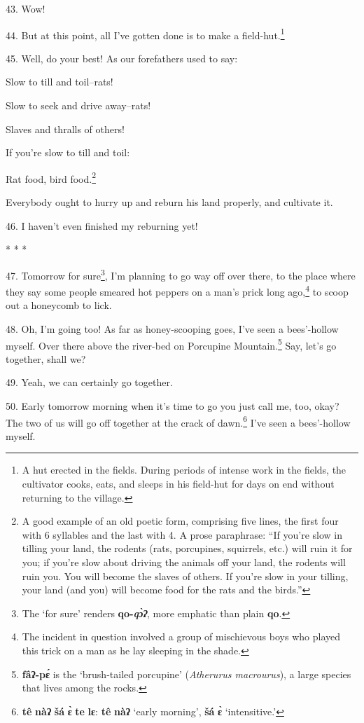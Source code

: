 43. Wow!

44. But at this point, all I've gotten done is to make a field-hut.\footnote{A hut erected in the fields. During periods of intense work in the fields, the cultivator cooks, eats, and sleeps in his field-hut for days on end without returning to the village.}

45. Well, do your best! As our forefathers used to say:

Slow to till and toil--rats!

Slow to seek and drive away--rats!

Slaves and thralls of others!

If you're slow to till and toil:

Rat food, bird food.\footnote{A good example of an old poetic form, comprising five lines, the first four with 6 syllables and the last with 4. A prose paraphrase: ``If you're slow in tilling your land, the rodents (rats, porcupines, squirrels, etc.) will ruin it for you; if you're slow about driving the animals off your land, the rodents will ruin you. You will become the slaves of others. If you're slow in your tilling, your land (and you) will become food for the rats and the birds.''}

Everybody ought to hurry up and reburn his land properly, and cultivate it.

46. I haven't even finished my reburning yet!

* * *

47. Tomorrow for sure\footnote{The `for sure' renders \textbf{qo-\textit{\emph{qɔ̀ʔ}}}, more emphatic than plain \textbf{qo}.}, I'm planning to go way off over there, to the place
where they say some people smeared hot peppers on a man's prick long ago,\footnote{The incident in question involved a group of mischievous boys who played this trick on a man as he lay sleeping in the shade.} to
scoop out a honeycomb to lick.

48. Oh, I'm going too! As far as honey-scooping goes, I've seen a bees'-hollow
myself. Over there above the river-bed on Porcupine Mountain.\footnote{\textbf{fâʔ-pɛ́} is the `brush-tailed porcupine' (\textit{Atherurus macrourus}), a large species that lives among the rocks.} Say, let's go
together, shall we?

49. Yeah, we can certainly go together.

50. Early tomorrow morning when it's time to go you just call me, too, okay? The
two of us will go off together at the crack of dawn.\footnote{\textbf{tê} \textbf{nàʔ} \textbf{šá} \textbf{ɛ̀} \textbf{te} \textbf{lɛ}: \textbf{tê} \textbf{nàʔ} `early morning', \textbf{šá} \textbf{ɛ̀} `intensitive.'} I've seen a bees'-hollow
myself.


